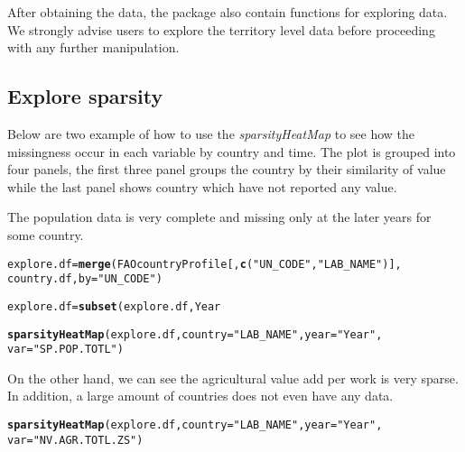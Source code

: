 \documentclass{article}\usepackage{graphicx, color}
\makeatletter
\newcommand{\hlfunctioncall}[1]{\textcolor[rgb]{0.501960784313725,0,0.329411764705882}{\textbf{#1}}}%
\newcommand{\hlstring}[1]{\textcolor[rgb]{0.6,0.6,1}{#1}}%
\newenvironment{kframe}{%
 \def\at@end@of@kframe{}%
 \ifinner\ifhmode%
  \def\at@end@of@kframe{\end{minipage}}%
  \begin{minipage}{\columnwidth}%
 \fi\fi%
 \def\FrameCommand##1{\hskip\@totalleftmargin \hskip-\fboxsep
 \colorbox{shadecolor}{##1}\hskip-\fboxsep
     \hskip-\linewidth \hskip-\@totalleftmargin \hskip\columnwidth}%
 \MakeFramed {\advance\hsize-\width
   \@totalleftmargin\z@ \linewidth\hsize
   \@setminipage}}%
 {\par\unskip\endMakeFramed%
 \at@end@of@kframe}
\newenvironment{knitrout}{}{} %
\makeatother
\begin{document}
After obtaining the data, the package also contain functions for
exploring data. We strongly advise users to explore the territory
level data before proceeding with any further manipulation.

\subsection{Explore sparsity}
Below are two example of how to use the \emph{sparsityHeatMap} to see
how the missingness occur in each variable by country and time. The plot
is grouped into four panels, the first three panel groups the country by
their similarity of value while the last panel shows country which have
not reported any value.

The population data is very complete and missing only at the later years
for some country.


\begin{knitrout}
\color{fgcolor}\begin{kframe}
\begin{alltt}
explore.df= \hlfunctioncall{merge}(FAOcountryProfile[, \hlfunctioncall{c}(\hlstring{"UN_CODE"}, \hlstring{"LAB_NAME"})],
  country.df, by = \hlstring{"UN_CODE"})
\end{alltt}


{\ttfamily\noindent\bfseries\color{errorcolor}{\#\# Error: object 'country.df' not found}}\begin{alltt}
explore.df = \hlfunctioncall{subset}(explore.df, Year %in% 1990:2012)
\end{alltt}


{\ttfamily\noindent\bfseries\color{errorcolor}{\#\# Error: object 'explore.df' not found}}\begin{alltt}
\hlfunctioncall{sparsityHeatMap}(explore.df, country = \hlstring{"LAB_NAME"}, year = \hlstring{"Year"},
                var = \hlstring{"SP.POP.TOTL"})
\end{alltt}


{\ttfamily\noindent\bfseries\color{errorcolor}{\#\# Error: could not find function "sparsityHeatMap"}}\end{kframe}
\end{knitrout}


\clearpage
On the other hand, we can see the agricultural value add per work is
very sparse. In addition, a large amount of countries does not even have
any data.
\begin{knitrout}
\color{fgcolor}\begin{kframe}
\begin{alltt}
\hlfunctioncall{sparsityHeatMap}(explore.df, country = \hlstring{"LAB_NAME"}, year = \hlstring{"Year"},
                var = \hlstring{"NV.AGR.TOTL.ZS"})
\end{alltt}


{\ttfamily\noindent\bfseries\color{errorcolor}{\#\# Error: could not find function "sparsityHeatMap"}}\end{kframe}
\end{knitrout}
\end{document}
